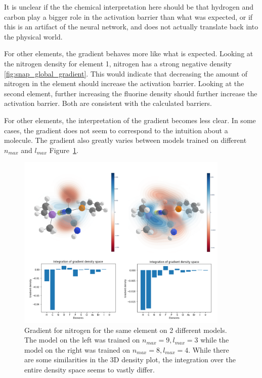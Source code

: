 It is unclear if the the chemical interpretation here should be that hydrogen and carbon play a bigger role in the activation
barrier than what was expected, or if this is an artifact of the neural network, and does not actually translate back into 
the physical world.

For other elements, the gradient behaves more like what is expected.
Looking at the nitrogen density for element 1, nitrogen has a strong negative density \ref{fig:snap_global_gradient}.
This would indicate that decreasing the amount of nitrogen in the element should increase the activation barrier.
Looking at the second element, further increasing the fluorine density should further increase the activation barrier.
Both are consistent with the calculated barriers.

For other elements, the interpretation of the gradient becomes less clear.
In some cases, the gradient does not seem to correspond to the intuition about a molecule.
The gradient also greatly varies between models trained on different $n_{max}$ and $l_{max}$ Figure~\ref{fig:snap-gradient-model}.

\begin{figure}
  \centering
  \includegraphics[width=0.9\textwidth]{figures/evaluation/Gradient-model-comp.png}
  \caption[Comparison of gradients between different models]{
      Gradient for nitrogen for the same element on 2 different models.
      The model on the left was trained on $n_{max} = 9, l_{max}=3$ while the model on the right was trained on 
      $n_{max}=8, l_{max}=4$. 
      While there are some similarities in the 3D density plot, the integration over the entire density space 
      seems to vastly differ.
   }
  \label{fig:snap-gradient-model}
\end{figure}


